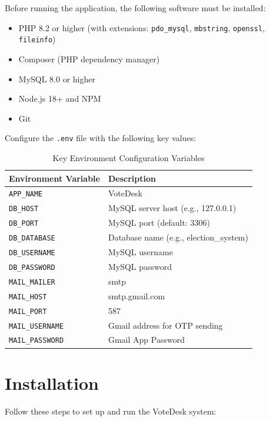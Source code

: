 Before running the application, the following software must be installed:

\begin{itemize}
    \item PHP 8.2 or higher (with extensions: \texttt{pdo\_mysql}, \texttt{mbstring}, \texttt{openssl}, \texttt{fileinfo})
    \item Composer (PHP dependency manager)
    \item MySQL 8.0 or higher
    \item Node.js 18+ and NPM
    \item Git
\end{itemize}

Configure the \texttt{.env} file with the following key values:

\renewcommand{\arraystretch}{1.3}
\begin{table}[H]
\centering
\begin{tabular}{|p{5cm}|p{7cm}|}
\hline
\textbf{Environment Variable} & \textbf{Description} \\
\hline
\texttt{APP\_NAME} & VoteDesk \\
\hline
\texttt{DB\_HOST} & MySQL server host (e.g., 127.0.0.1) \\
\hline
\texttt{DB\_PORT} & MySQL port (default: 3306) \\
\hline
\texttt{DB\_DATABASE} & Database name (e.g., election\_system) \\
\hline
\texttt{DB\_USERNAME} & MySQL username \\
\hline
\texttt{DB\_PASSWORD} & MySQL password \\
\hline
\texttt{MAIL\_MAILER} & smtp \\
\hline
\texttt{MAIL\_HOST} & smtp.gmail.com \\
\hline
\texttt{MAIL\_PORT} & 587 \\
\hline
\texttt{MAIL\_USERNAME} & Gmail address for OTP sending \\
\hline
\texttt{MAIL\_PASSWORD} & Gmail App Password \\
\hline
\end{tabular}
\caption{Key Environment Configuration Variables}
\label{tab:env_config}
\end{table}

\section{Installation}

Follow these steps to set up and run the VoteDesk system:

